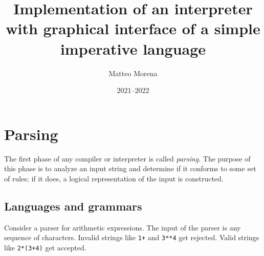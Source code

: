 \documentclass[11pt, american, draft]{PhdThesis}
\author{Matteo Morena}
\title{Implementation of an interpreter with graphical interface of a simple imperative language}
\date{2021--2022}
\begin{document}
  \pagestyle{empty}
  \maketitle




  \frontmatter
  \pagestyle{serif}
  \tableofcontents



  \mainmatter



  \chapter{Parsing}

  The first phase of any compiler or interpreter is called \emph{parsing}. The purpose of this
  phase is to analyze an input string and determine if it conforms to some set of rules; if it
  does, a logical representation of the input is constructed.

  \section{Languages and grammars}

  Consider a parser for arithmetic expressions. The input of the parser is any sequence of
  characters. Invalid strings like \verb$1+$ and \verb$3**4$ get rejected. Valid strings like
  \verb$2*(3+4)$ get accepted.
\end{document}
